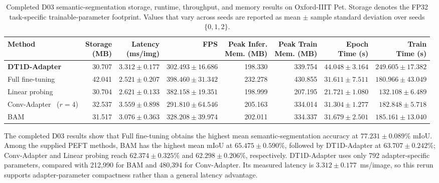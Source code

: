 \documentclass[pdflatex,sn-mathphys-num]{sn-jnl}
\theoremstyle{thmstyleone}
\theoremstyle{thmstyletwo}
\theoremstyle{thmstylethree}
\begin{document}
\begin{table}[!htbp]
\centering
\caption{Completed D03 semantic-segmentation storage, runtime, throughput, and memory results on Oxford-IIIT Pet. Storage denotes the FP32 task-specific trainable-parameter footprint. Values that vary across seeds are reported as mean $\pm$ sample standard deviation over seeds $\{0,1,2\}$.}
\label{tab:seg_pet_deeplabv3_efficiency}
\scriptsize
\setlength{\tabcolsep}{2.6pt}
\renewcommand{\arraystretch}{1.12}
\begin{tabularx}{\textwidth}{@{}Xrrrrrrr@{}}
\toprule
\textbf{Method} &
\makecell{\textbf{Storage}\\\textbf{(MB)}} &
\makecell{\textbf{Latency}\\\textbf{(ms/img)}} &
\textbf{FPS} &
\makecell{\textbf{Peak Infer.}\\\textbf{Mem. (MB)}} &
\makecell{\textbf{Peak Train}\\\textbf{Mem. (MB)}} &
\makecell{\textbf{Epoch}\\\textbf{Time (s)}} &
\makecell{\textbf{Train}\\\textbf{Time (s)}} \\
\midrule
\textbf{DT1D-Adapter} & 30.707 & $3.312\pm0.177$ & $302.493\pm16.686$ & 198.330 & 339.754 & $44.048\pm3.164$ & $249.605\pm17.382$ \\
Full fine-tuning & 42.041 & $2.521\pm0.207$ & $398.460\pm31.342$ & 232.278 & 430.855 & $31.611\pm7.511$ & $180.966\pm43.049$ \\
Linear probing & 30.704 & $2.621\pm0.133$ & $382.158\pm19.351$ & 198.999 & 207.195 & $21.721\pm1.080$ & $132.108\pm6.489$ \\
Conv-Adapter~\cite{chen2024convadapter} ($r=4$) & 32.537 & $3.559\pm0.898$ & $291.810\pm64.546$ & 205.163 & 334.014 & $31.304\pm1.277$ & $182.848\pm5.718$ \\
BAM~\cite{park2020lightweightattention} & 31.517 & $3.076\pm0.363$ & $328.208\pm39.974$ & 202.011 & 334.337 & $31.679\pm2.501$ & $185.161\pm13.040$ \\
\bottomrule
\end{tabularx}
\end{table}

The completed D03 results show that Full fine-tuning obtains the highest mean semantic-segmentation accuracy at $77.231\pm0.089\%$ mIoU. Among the supplied PEFT methods, BAM has the highest mean mIoU at $65.475\pm0.590\%$, followed by DT1D-Adapter at $63.707\pm0.242\%$; Conv-Adapter and Linear probing reach $62.374\pm0.325\%$ and $62.298\pm0.206\%$, respectively. DT1D-Adapter uses only 792 adapter-specific parameters, compared with 212,990 for BAM and 480,394 for Conv-Adapter. Its measured latency is $3.312\pm0.177$~ms/image, so this rerun supports adapter-parameter compactness rather than a general latency advantage.
\end{document}
